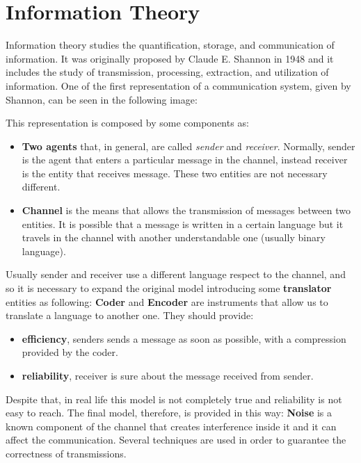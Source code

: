 \section {Information Theory}
Information theory studies the quantification, storage, and communication of information. It was originally proposed by Claude E. Shannon in 1948 and it includes the study of transmission, processing, extraction, and utilization of information. One of the first representation of a communication system, given by Shannon, can be seen in the following image:

This representation is composed by some components as:
\begin{itemize}
	\item \textbf{Two agents} that, in general, are called \textit{sender} and \textit{receiver}. Normally, sender is the agent that enters a particular message in the channel, instead receiver is the entity that receives message. These two entities are not necessary different.
	\item \textbf{Channel} is the means that allows the transmission of messages between two entities. It is possible that a message is written in a certain language but it travels in the channel with another understandable one (usually binary language).
\end{itemize}

Usually sender and receiver use a different language respect to the channel, and so it is necessary to expand the original model introducing some \textbf{translator} entities as following: 
\textbf{Coder} and \textbf{Encoder} are instruments that allow us to translate a language to another one. They should provide:
\begin{itemize}
	\item \textbf{efficiency}, senders sends a message as soon as possible, with a compression provided by the coder.
	\item \textbf{reliability}, receiver is sure about the message received from sender.
\end{itemize}
Despite that, in real life this model is not completely true and reliability is not easy to reach. The final model, therefore, is provided in this way: 
\textbf{Noise} is a known component of the channel that creates interference inside it and it can affect the communication. Several techniques are used in order to guarantee the correctness of transmissions.


